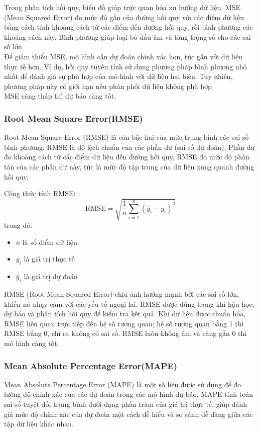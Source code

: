 \documentclass[conference]{IEEEtran}
\begin{document}
Trong phân tích hồi quy, biểu đồ giúp trực quan hóa xu hướng dữ liệu. MSE (Mean Squared Error) đo mức độ gần của đường hồi quy với các điểm dữ liệu bằng cách tính khoảng cách từ các điểm đến đường hồi quy, rồi bình phương các khoảng cách này. Bình phương giúp loại bỏ dấu âm và tăng trọng số cho các sai số lớn.\\
Để giảm thiểu MSE, mô hình cần dự đoán chính xác hơn, tức gần với dữ liệu thực tế hơn. Ví dụ, hồi quy tuyến tính sử dụng phương pháp bình phương nhỏ nhất để đánh giá sự phù hợp của mô hình với dữ liệu hai biến. Tuy nhiên, phương pháp này có giới hạn nếu phân phối dữ liệu không phù hợp\\
MSE càng thấp thì dự báo càng tốt.\\


\subsubsection{Root Mean Square Error(RMSE)}


Root Mean Square Error (RMSE) là căn bậc hai của mức trung bình các sai số bình phương. RMSE là độ lệch chuẩn của các phần dư (sai số dự đoán). Phần dư đo khoảng cách từ các điểm dữ liệu đến đường hồi quy, RMSE đo mức độ phân tán của các phần dư này, tức là mức độ tập trung của dữ liệu xung quanh đường hồi quy.

Công thức tính RMSE:
\[
\text{RMSE} = \sqrt{\frac{1}{n} \sum_{i=1}^{n} (\hat{y}_i - y_i)^2}
\]
trong đó:
\begin{itemize}
    \item $n$ là số điểm dữ liệu
    \item $y_i$ là giá trị thực tế
    \item $\hat{y}_i$ là giá trị dự đoán
\end{itemize}

RMSE (Root Mean Squared Error) chịu ảnh hưởng mạnh bởi các sai số lớn, khiến nó nhạy cảm với các yếu tố ngoại lai. RMSE được dùng trong khí hậu học, dự báo và phân tích hồi quy để kiểm tra kết quả. Khi dữ liệu được chuẩn hóa, RMSE liên quan trực tiếp đến hệ số tương quan; hệ số tương quan bằng 1 thì RMSE bằng 0, chỉ ra không có sai số. RMSE luôn không âm và càng gần 0 thì mô hình càng tốt.
 
\subsubsection{Mean Absolute Percentage Error(MAPE)}

Mean Absolute Percentage Error (MAPE) là một số liệu được sử dụng để đo lường độ chính xác của các dự đoán trong các mô hình dự báo. MAPE tính toán sai số tuyệt đối trung bình dưới dạng phần trăm của giá trị thực tế, giúp đánh giá mức độ chính xác của dự đoán một cách dễ hiểu và so sánh dễ dàng giữa các tập dữ liệu khác nhau.
\end{document}
